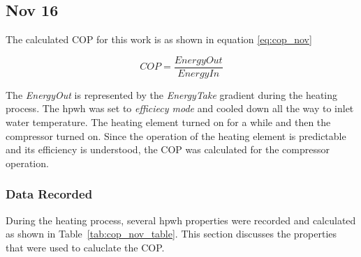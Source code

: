 \subsection{Nov 16}

The calculated COP for this work is as shown in equation \ref{eq:cop_nov}

\begin{equation}\label{eq:cop_nov}
    COP = \frac{EnergyOut}{EnergyIn}
\end{equation}

The \textit{EnergyOut} is represented by the \textit{EnergyTake} gradient during the heating process. The \gls{hpwh} was set to \textit{efficiecy mode} and cooled down all the way to inlet water temperature. The heating element turned on for a while and then the compressor turned on. Since the operation of the heating element is predictable and its efficiency is understood, the COP was calculated for the compressor operation.

\subsubsection{Data Recorded}

During the heating process, several \gls{hpwh} properties were recorded and calculated as shown in Table~\ref{tab:cop_nov_table}. This section discusses the properties that were used to caluclate the COP. 

